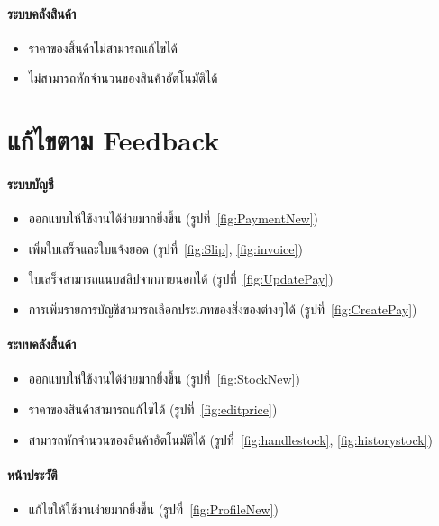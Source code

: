 \paragraph{ระบบคลังสินค้า}
\begin{itemize}
    \item ราคาของสิ้นค้าไม่สามารถแก้ไขได้
    \item ไม่สามารถหักจำนวนของสินค้าอัตโนมัติได้
\end{itemize}

\section{แก้ไขตาม Feedback}
\paragraph{ระบบบัญชี}
\begin{itemize}
    \item ออกแบบให้ใช้งานได้ง่ายมากยิ่งขึ้น (รูปที่~\ref{fig:PaymentNew})
    \item เพิ่มใบเสร็จและใบแจ้งยอด (รูปที่~\ref{fig:Slip}, \ref{fig:invoice})
    \item ใบเสร็จสามารถแนบสลิปจากภายนอกได้ (รูปที่~\ref{fig:UpdatePay})
    \item การเพิ่มรายการบัญชีสามารถเลือกประเภทของสิ่งของต่างๆได้ (รูปที่~\ref{fig:CreatePay})
\end{itemize}
\paragraph{ระบบคลังสิ้นค้า}
\begin{itemize}
    \item ออกแบบให้ใช้งานได้ง่ายมากยิ่งขึ้น (รูปที่~\ref{fig:StockNew})
    \item ราคาของสินค้าสามารถแก้ไขได้ (รูปที่~\ref{fig:editprice})
    \item สามารถหักจำนวนของสินค้าอัตโนมัติได้ (รูปที่~\ref{fig:handlestock}, \ref{fig:historystock})
\end{itemize}
\paragraph{หน้าประวัติ}
\begin{itemize}
    \item แก้ไขให้ใช้งานง่ายมากยิ่งขึ้น (รูปที่~\ref{fig:ProfileNew})
\end{itemize}



